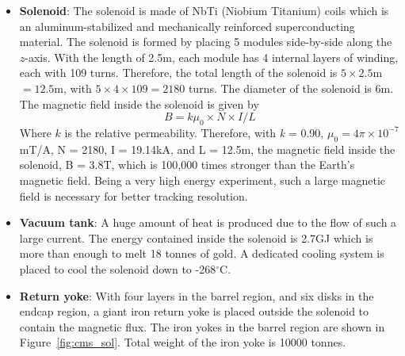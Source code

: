 \begin{itemize}[leftmargin=*]
\item \textbf{Solenoid}:
	The solenoid is made of NbTi (Niobium Titanium) coils which 
	is an aluminum-stabilized and mechanically reinforced superconducting 
	material. The solenoid is formed by placing 5 modules side-by-side 
	along the $z$-axis. With the length of 2.5\unit{m}, each module has 4 internal 
	layers of winding, each with 109 turns. Therefore, the total length of 
	the solenoid is $5\times 2.5$\unit{m} $ = 12.5$\unit{m}, with $5\times 4 \times 109 = 
	2180$ turns. The diameter of the solenoid is 6\unit{m}. The magnetic field 
	inside the solenoid is given by
	\begin{equation}
		B = k\mu_0\times N\times I/L
	\end{equation}
	Where $k$ is the relative permeability. Therefore, with 
	\textit{k} = 0.90, $\mu_0 = 4\pi\times 10^{-7}$\unit{mT/A}, N = 2180, 
	I = 19.14\unit{kA}, and L = 12.5\unit{m}, the magnetic field inside the solenoid, 
	B = 3.8\unit{T}, which is 100,000 times stronger than the Earth's magnetic 
	field. Being a very high energy experiment, such a large magnetic 
	field is necessary for better tracking resolution.
\item \textbf{Vacuum tank}: A huge amount of heat is produced due to the 
	flow of such a large current. The energy contained inside the solenoid 
	is 2.7\unit{GJ} which is more than enough to melt 18 tonnes of gold. A 
	dedicated cooling system is placed to cool the solenoid down to 
	-268$^\circ$C.
\item \textbf{Return yoke}: With four layers in the barrel region, and six
	disks in the endcap region, a giant iron return yoke is placed outside 
	the solenoid to contain the magnetic flux. The iron yokes in the barrel 
	region are shown in Figure~\ref{fig:cms_sol}. Total weight of the
	iron yoke is 10000 tonnes.
\end{itemize}

